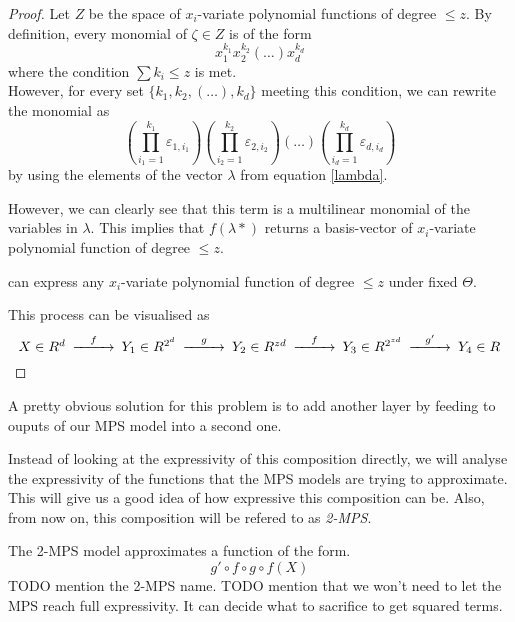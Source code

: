 \documentclass{article}
\theoremstyle{definition}
\theoremstyle{definition}
\begin{document}
\begin{proof}
Let $Z$ be the space of $x_i$-variate polynomial functions 
of degree $\leq z$. By definition, every monomial of $\zeta \in Z$ is of the form
\begin{equation}
    x_{1}^{k_1}x_{2}^{k_2}(\dots)x_{d}^{k_d}
\end{equation}
where the condition $\sum k_i \leq z$ is met. \\
However, for every set $\{k_1, k_2, (\dots), k_d\}$ meeting this condition,
we can rewrite the monomial as
\begin{equation}
    \left( \prod_{i_1=1}^{k_1}\varepsilon_{1, i_1} \right)
    \left( \prod_{i_2=1}^{k_2}\varepsilon_{2, i_2} \right)
    \left( \dots \right)
    \left( \prod_{i_d=1}^{k_d}\varepsilon_{d, i_d} \right)
\end{equation}
by using the elements of the vector $\lambda$ from equation \eqref{lambda}.

However, we can clearly see that this term is a multilinear 
monomial of the variables in $\lambda$. This implies that
$f(\lambda*)$ returns a basis-vector of $x_i$-variate polynomial 
function of degree $\leq z$.


can express any $x_i$-variate polynomial function of degree $\leq z$ under
fixed $\Theta$.

This process can be visualised as 
\begin{equation} \label{composition_graph}
    \begin{CD}
        @. X \in R^d 
        @>f>> Y_1 \in R^{2^d}
        @>g>> Y_2 \in R^{zd} 
        @>f>> Y_3 \in R^{2^{zd}}
        @>g'>> Y_4 \in R
    \end{CD}
\end{equation}

\end{proof}
A pretty obvious solution for this problem is to add another layer by feeding to ouputs of 
our MPS model into a second one.

Instead of looking at the expressivity of this composition directly, we will analyse 
the expressivity of the functions that the MPS models are trying to approximate. This 
will give us a good idea of how expressive this composition can be. Also, from now on,
this composition will be refered to as \emph{2-MPS}.

The 2-MPS model approximates a function of the form.
\[  
    g' \circ f \circ g \circ f (X)
\]
TODO mention the 2-MPS name.
TODO mention that we won't need to let the MPS reach full expressivity. It can decide what to sacrifice to get squared terms.
\end{document}
